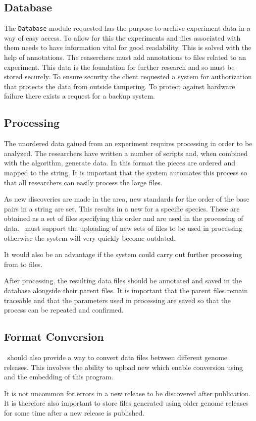 \subsection{Database}
The \texttt{Database} module requested has the purpose to archive experiment data in a way of easy access. To allow for this the experiments and files associated with them needs to have information vital for good readability. This is solved with the help of annotations. The reaserchers must add annotations to files related to an experiment.
This data is the foundation for further research and so must be stored securely. To ensure security the client requested a system for authorization that protects the data from outside tampering. To protect against hardware failure there exists a request for a backup system.

\subsection{Processing}
The unordered  data gained from an experiment requires processing in order to be analyzed. The researchers have written a number of scripts and, when combined with the  algorithm, generate  data. In this format the  pieces are ordered and mapped to the  string. It is important that the system automates this process so that all researchers can easily process the large  files.

As new discoveries are made in the area, new standards for the order of the base pairs in a  string are set. This results in a new  for a specific species. These are obtained as a set of files specifying this order and are used in the processing of  data. \appName\ must support the uploading of new sets of  files to be used in processing otherwise the system will very quickly become outdated. 

It would also be an advantage if the system could carry out further processing from  to  files.

After processing, the resulting data files should be annotated and saved in the database alongside their parent files. It is important that the parent files remain traceable and that the parameters used in processing are saved so that the process can be repeated and confirmed.

\subsection{Format Conversion}
\appName\ should also provide a way to convert  data files between different genome releases. This involves the ability to upload new  which enable conversion using  and the embedding of this program.

It is not uncommon for errors in a new release to be discovered after publication. It is therefore also important to store files generated using older genome releases for some time after a new release is published.

